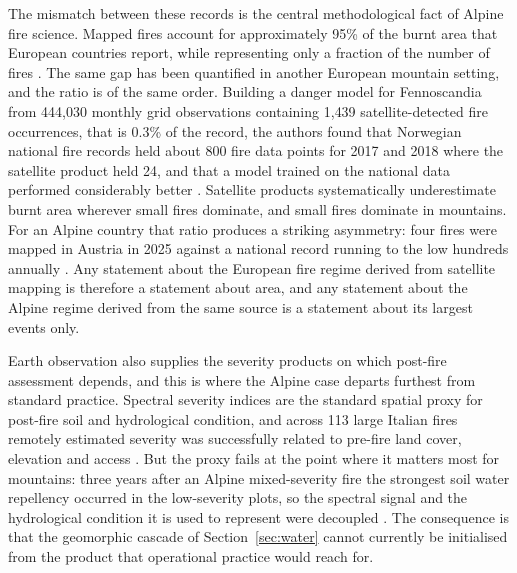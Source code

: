 \documentclass[11pt,a4paper]{article}
\begin{document}
The mismatch between these records is the central methodological fact of Alpine fire science. Mapped fires account for approximately 95\% of the burnt area that European countries report, while representing only a fraction of the number of fires \citep{jrc_advance_2026}. The same gap has been quantified in another European mountain setting, and the ratio is of the same order. Building a danger model for Fennoscandia from 444{,}030 monthly grid observations containing 1{,}439 satellite-detected fire occurrences, that is 0.3\% of the record, the authors found that Norwegian national fire records held about 800 fire data points for 2017 and 2018 where the satellite product held 24, and that a model trained on the national data performed considerably better \citep{bakke_datadriven_2023}. Satellite products systematically underestimate burnt area wherever small fires dominate, and small fires dominate in mountains. For an Alpine country that ratio produces a striking asymmetry: four fires were mapped in Austria in 2025 against a national record running to the low hundreds annually \citep{jrc_advance_2026, papathomakohle_towards_2025}. Any statement about the European fire regime derived from satellite mapping is therefore a statement about area, and any statement about the Alpine regime derived from the same source is a statement about its largest events only.

Earth observation also supplies the severity products on which post-fire assessment depends, and this is where the Alpine case departs furthest from standard practice. Spectral severity indices are the standard spatial proxy for post-fire soil and hydrological condition, and across 113 large Italian fires remotely estimated severity was successfully related to pre-fire land cover, elevation and access \citep{malandra_burn_2022}. But the proxy fails at the point where it matters most for mountains: three years after an Alpine mixed-severity fire the strongest soil water repellency occurred in the low-severity plots, so the spectral signal and the hydrological condition it is used to represent were decoupled \citep{negri_wildfire_2026}. The consequence is that the geomorphic cascade of Section~\ref{sec:water} cannot currently be initialised from the product that operational practice would reach for.
\end{document}
